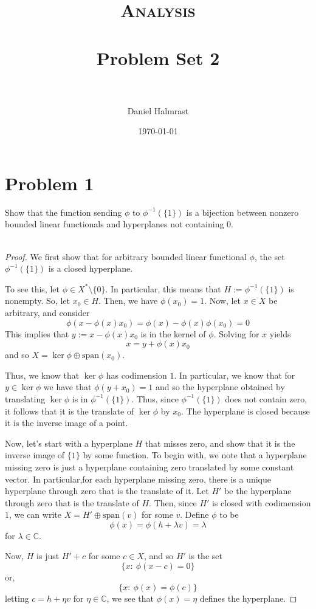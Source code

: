 \documentclass[fontsize=11pt]{scrartcl} %
\title{	
\normalfont \normalsize 
\textsc{Analysis} \\ [25pt] %
\horrule{0.5pt} \\[0.4cm] %
\huge Problem Set 2 \\ %
\horrule{2pt} \\[0.5cm] %
}
\author{Daniel Halmrast} %
\date{\normalsize\today} %
\numberwithin{equation}{section} %
\numberwithin{figure}{section} %
\numberwithin{table}{section} %
\newcommand{\C}{\mathbb{C}}
\begin{document}
\maketitle %

\section*{Problem 1}
Show that the function sending $\phi$ to $\phi^{-1}(\{1\})$ is a bijection
between nonzero bounded linear functionals and hyperplanes not containing $0$.
\\
\\
\begin{proof}
    We first show that for arbitrary bounded linear functional $\phi$, the set
    $\phi^{-1}(\{1\})$ is a closed hyperplane.

    To see this, let $\phi\in X^*\setminus \{0\}$. In particular, this means
    that $H:=\phi^{-1}(\{1\})$ is nonempty. So, let $x_0\in H$. Then, we have
    $\phi(x_0) = 1$. Now, let $x\in X$ be arbitrary, and consider
    \[
        \phi(x-\phi(x)x_0) = \phi(x)-\phi(x)\phi(x_0)=0
    \]
    This implies that $y:=x-\phi(x)x_0$ is in the kernel of $\phi$. Solving for
    $x$ yields
    \[
        x = y+\phi(x)x_0
    \]
    and so $X=\ker\phi\oplus\text{span}(x_0)$.

    Thus, we know that $\ker\phi$ has codimension $1$. In particular, we know
    that for $y\in\ker\phi$ we have that $\phi(y+x_0) = 1$ and so the hyperplane
    obtained by translating $\ker\phi$ is in $\phi^{-1}(\{1\})$. Thus, since
    $\phi^{-1}(\{1\})$ does not contain zero, it follows that it is the
    translate of $\ker\phi$ by $x_0$. The hyperplane is closed because it is the
    inverse image of a point.

    Now, let's start with a hyperplane $H$ that misses zero, and show that it is the
    inverse image of $\{1\}$ by some function. To begin with, we note that a
    hyperplane missing zero is just a hyperplane containing zero translated by
    some constant vector. In particular,for each hyperplane missing zero, there
    is a unique hyperplane through zero that is the translate of it. Let $H'$ be
    the hyperplane through zero that is the translate of $H$. Then, since $H'$
    is closed with codimension $1$, we can write $X=H'\oplus \text{span}(v)$ for
    some $v$. Define $\phi$ to be
    \[
        \phi(x) = \phi(h+\lambda v) = \lambda
    \]
    for $\lambda\in\C$.

    Now, $H$ is just $H'+c$ for some $c\in X$, and so $H'$ is the set
    \[
        \{x:\ \phi(x-c)=0\}
    \]
    or,
    \[
        \{x:\ \phi(x)=\phi(c)\}
    \]
    letting $c=h+\eta v$ for $\eta\in\C$, we see that $\phi(x) = \eta$ defines
    the hyperplane.


\end{proof}
\end{document}
